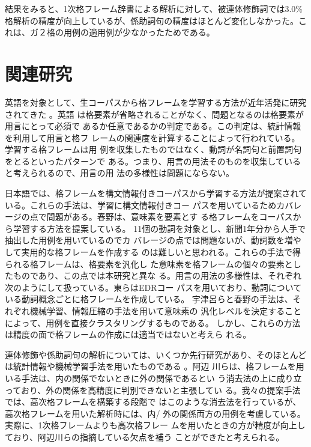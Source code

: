 \documentclass[fleqn]{nlp}
\begin{document}
結果をみると、1次格フレーム辞書による解析に対して、被連体修飾詞では3.0\%
格解析の精度が向上しているが、係助詞句の精度はほとんど変化しなかった。こ
れは、ガ２格の用例の適用例が少なかったためである。


\section{関連研究}

英語を対象として、生コーパスから格フレームを学習する方法が近年活発に研究
されてきた
\cite{Brent1993,Ushioda1993,Manning1993,Briscoe1997,Korhonen2003} 。英語
は格要素が省略されることがなく、問題となるのは格要素が用言にとって必須で
あるか任意であるかの判定である。この判定は、統計情報を利用して用言と格フ
レームの関連度を計算することによって行われている。学習する格フレームは用
例を収集したものではなく、動詞が名詞句と前置詞句をとるといったパターンで
ある。つまり、用言の用法そのものを収集していると考えられるので、用言の用
法の多様性は問題にならない。

日本語では、格フレームを構文情報付きコーパスから学習する方法が提案されて
いる\cite{Azuma1996,Utsuro1997}。これらの手法は、学習に構文情報付きコー
パスを用いているためカバレージの点で問題がある。春野は、意味素を要素とす
る格フレームをコーパスから学習する方法を提案している\cite{Haruno1995}。
11個の動詞を対象とし、新聞1年分から人手で抽出した用例を用いているのでカ
バレージの点では問題ないが、動詞数を増やして実用的な格フレームを作成する
のは難しいと思われる。これらの手法で得られる格フレームは、格要素を汎化し
た意味素を格フレームの個々の要素としたものであり、この点では本研究と異な
る。用言の用法の多様性は、それぞれ次のようにして扱っている。東らはEDRコー
パスを用いており、動詞についている動詞概念ごとに格フレームを作成している。
宇津呂らと春野の手法は、それぞれ機械学習、情報圧縮の手法を用いて意味素の
汎化レベルを決定することによって、用例を直接クラスタリングするものである。
しかし、これらの方法は精度の面で格フレームの作成には適当ではないと考えら
れる。

連体修飾や係助詞句の解析については、いくつか先行研究があり、そのほとんど
は統計情報や機械学習手法を用いたものである
\cite{Baldwin1999,Abekawa2001,Torisawa2001,Murata2001,Abekawa2004}。阿辺
川らは、格フレームを用いる手法は、内の関係でないときに外の関係であるとい
う消去法の上に成り立っており、外の関係を高精度に判別できないと主張してい
る\cite{Abekawa2004}。我々の提案手法では、高次格フレームを構築する段階で
はこのような消去法を行っているが、高次格フレームを用いた解析時には、内/
外の関係両方の用例を考慮している。実際に、1次格フレームよりも高次格フレー
ムを用いたときの方が精度が向上しており、阿辺川らの指摘している欠点を補う
ことができたと考えられる。
\end{document}

